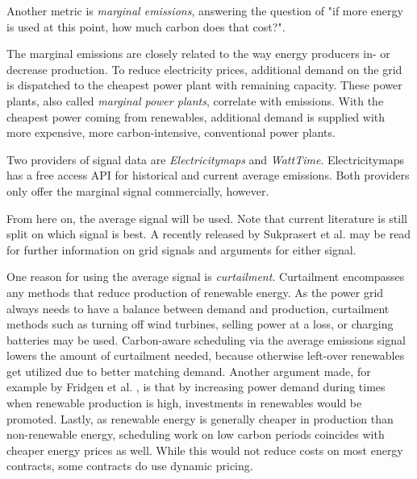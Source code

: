 Another metric is \emph{marginal emissions}, answering the question of "if more energy is used at this point, how much carbon does that cost?".

The marginal emissions are closely related to the way energy producers in- or decrease production.
To reduce electricity prices, additional demand on the grid is dispatched to the cheapest power plant with remaining capacity.
These power plants, also called \emph{marginal power plants}, correlate with emissions.
With the cheapest power coming from renewables, additional demand is supplied with more expensive, more carbon-intensive, conventional power plants.

Two providers of signal data are \emph{Electricitymaps} and \emph{WattTime}.
Electricitymaps has a free access API for historical and current average emissions. Both providers only offer the marginal signal commercially, however. 

From here on, the average signal will be used. 
Note that current literature is still split on which signal is best. 
A recently released by Sukprasert et al. \cite{sukprasert_limitations_2024} may be read for further information on grid signals and arguments for either signal.

One reason for using the average signal is \emph{curtailment}. 
Curtailment encompasses any methods that reduce production of renewable energy. As the power grid always needs to have a balance between demand and production, curtailment methods such as turning off wind turbines, selling power at a loss, or charging batteries may be used. 
Carbon-aware scheduling via the average emissions signal lowers the amount of curtailment needed, because otherwise left-over renewables get utilized due to better matching demand.
Another argument made, for example by Fridgen et al. \cite{fridgen_not_2021}, is that by increasing power demand during times when renewable production is high, investments in renewables would be promoted. 
Lastly, as renewable energy is generally cheaper in production than non-renewable energy, scheduling work on low carbon periods coincides with cheaper energy prices as well. While this would not reduce costs on most energy contracts, some contracts do use dynamic pricing.

